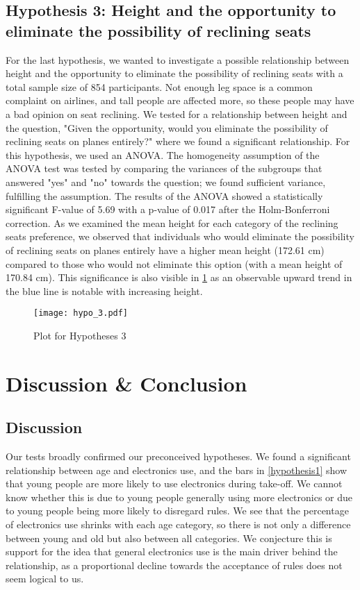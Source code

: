 \documentclass{article}
\theoremstyle{plain}
\theoremstyle{definition}
\theoremstyle{remark}
\begin{document}
\subsection{Hypothesis 3: Height and the opportunity to eliminate the possibility of reclining seats}
For the last hypothesis, we wanted to investigate a possible relationship between height and the opportunity to eliminate the possibility of reclining seats with a total sample size of 854 participants. Not enough leg space is a common complaint on airlines, and tall people are affected more, so these people may have a bad opinion on seat reclining. We tested for a relationship between height and the question, "Given the opportunity, would you eliminate the possibility of reclining seats on planes entirely?" where we found a significant relationship. For this hypothesis, we used an ANOVA. The homogeneity assumption of the ANOVA test was tested by comparing the variances of the subgroups that answered "yes" and "no" towards the question; we found sufficient variance, fulfilling the assumption. The results of the ANOVA showed a statistically significant F-value of 5.69 with a p-value of 0.017 after the Holm-Bonferroni correction. As we examined the mean height for each category of the reclining seats preference, we observed that individuals who would eliminate the possibility of reclining seats on planes entirely have a higher mean height (172.61 cm) compared to those who would not eliminate this option (with a mean height of 170.84 cm). This significance is also visible in \ref{hypothesis3} as an observable upward trend in the blue line is notable with increasing height.
\begin{figure}[h]
    \texttt{[image: hypo\_3.pdf]}
    \caption{Plot for Hypotheses 3}
    \label{hypothesis3}
\end{figure}



\section{Discussion \& Conclusion}\label{sec:conclusion}

\subsection{Discussion}
Our tests broadly confirmed our preconceived hypotheses. We found a significant relationship between age and electronics use, and the bars in \ref{hypothesis1} show that young people are more likely to use electronics during take-off. We cannot know whether this is due to young people generally using more electronics or due to young people being more likely to disregard rules. We see that the percentage of electronics use shrinks with each age category, so there is not only a difference between young and old but also between all categories. We conjecture this is support for the idea that general electronics use is the main driver behind the relationship, as a proportional decline towards the acceptance of rules does not seem logical to us. 
\end{document}
